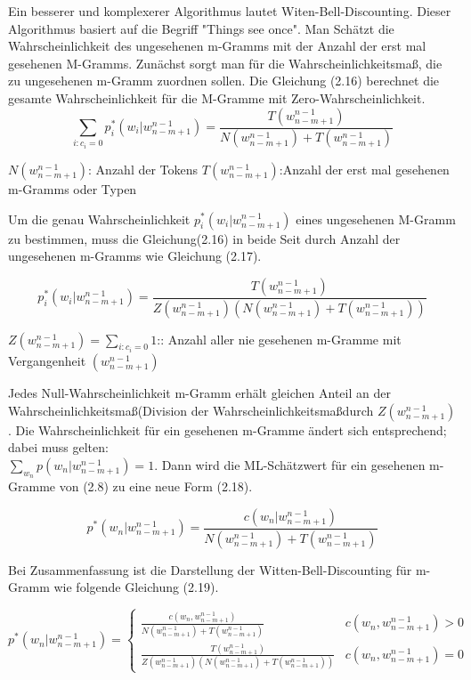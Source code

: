 Ein besserer und komplexerer Algorithmus lautet Witen-Bell-Discounting.
Dieser Algorithmus basiert auf die Begriff "Things see once". Man Sch\"atzt die Wahrscheinlichkeit des ungesehenen m-Gramms mit der Anzahl der erst mal gesehenen M-Gramms. Zun\"achst sorgt man f\"ur die Wahrscheinlichkeitsma\ss , die zu ungesehenen m-Gramm zuordnen sollen. Die Gleichung (2.16) berechnet die  gesamte Wahrscheinlichkeit f\"ur  die M-Gramme mit Zero-Wahrscheinlichkeit.
\begin{equation}
\label{equation:witten_bell_01}
\sum_{i:c_{i}=0}p_{i}^{*}(w_{i}|w_{n-m+1}^{n-1})=\frac{T(w_{n-m+1}^{n-1})}{N(w_{n-m+1}^{n-1})+T(w_{n-m+1}^{n-1})}
\end{equation}

$N(w_{n-m+1}^{n-1})$: Anzahl der Tokens
$T(w_{n-m+1}^{n-1})$:Anzahl der erst mal gesehenen m-Gramms oder Typen

Um die genau Wahrscheinlichkeit $p_{i}^{*}(w_{i}|w_{n-m+1}^{n-1})$ eines ungesehenen M-Gramm zu bestimmen, muss die Gleichung(2.16) in beide Seit durch Anzahl der ungesehenen m-Gramms wie Gleichung (2.17).

\begin{equation}
\label{equation:witten_bell_02}
p_{i}^{*}(w_{i}|w_{n-m+1}^{n-1})=\frac{T(w_{n-m+1}^{n-1})}{Z(w_{n-m+1}^{n-1})(N(w_{n-m+1}^{n-1})+T(w_{n-m+1}^{n-1}))}
\end{equation}

$Z(w_{n-m+1}^{n-1})=\sum_{i:c_{i}=0}1$:: Anzahl aller nie gesehenen m-Gramme mit Vergangenheit $(w_{n-m+1}^{n-1})$

Jedes Null-Wahrscheinlichkeit m-Gramm erh\"alt gleichen Anteil an der Wahrscheinlichkeitsma\ss (Division der Wahrscheinlichkeitsma\ss durch $Z(w_{n-m+1}^{n-1})$.
Die Wahrscheinlichkeit f\"ur ein gesehenen m-Gramme \"andert sich entsprechend; dabei muss gelten:\\ 
$\sum_{w_{n}}p(w_{n}|w_{n-m+1}^{n-1})=1$. Dann wird die ML-Sch\"atzwert  f\"ur ein gesehenen m-Gramme von (2.8) zu eine neue Form (2.18). 

\begin{equation}
\label{equation:witten_bell_03}
p^{*}(w_{n}|w_{n-m+1}^{n-1})=\frac{c(w_{n}|w_{n-m+1}^{n-1})}{N(w_{n-m+1}^{n-1})+T(w_{n-m+1}^{n-1})}
\end{equation}

Bei Zusammenfassung ist die Darstellung der Witten-Bell-Discounting f\"ur m-Gramm wie folgende Gleichung (2.19).

\begin{equation}
\label{equationo:witten_bell_04}
p^{*}(w_{n}|w_{n-m+1}^{n-1})=\begin{cases}
\frac{c(w_{n},w_{n-m+1}^{n-1})}{N(w_{n-m+1}^{n-1})+T(w_{n-m+1}^{n-1})} & c(w_{n},w_{n-m+1}^{n-1})>0 \\
\frac{T(w_{n-m+1}^{n-1})}{Z(w_{n-m+1}^{n-1})(N(w_{n-m+1}^{n-1})+T(w_{n-m+1}^{n-1}))} & c(w_{n},w_{n-m+1}^{n-1})=0 
\end{cases}
\end{equation}
